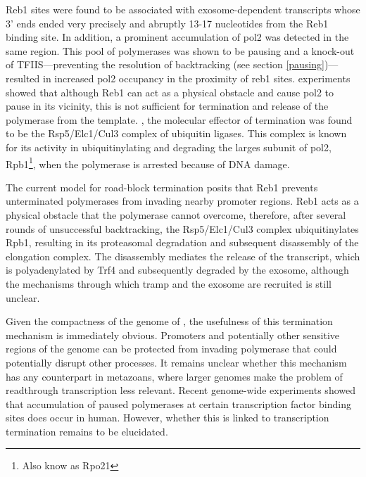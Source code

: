 Reb1 sites were found to be associated with exosome-dependent transcripts whose 3' ends ended very precisely and abruptly 13-17 nucleotides from the Reb1 binding site. 
In addition, a prominent accumulation of \gls{pol2} was detected in the same region.
This pool of polymerases was shown to be pausing and a knock-out of TFIIS---preventing the resolution of backtracking (see section \ref{pausing})---resulted in increased \gls{pol2} occupancy in the proximity of reb1 sites.
\Invitro{} experiments showed that although Reb1 can act as a physical obstacle and cause \gls{pol2} to pause in its vicinity, this is not sufficient for termination and release of the polymerase from the template.
\Invivo{}, the molecular effector of termination was found to be the Rsp5/Elc1/Cul3 complex of ubiquitin ligases.
This complex is known for its activity in ubiquitinylating and degrading the larges subunit of \gls{pol2}, Rpb1\footnote{Also know as Rpo21}, when the polymerase is arrested because of DNA damage.

The current model for road-block termination posits that Reb1 prevents unterminated polymerases from invading nearby promoter regions. 
Reb1 acts as a physical obstacle that the polymerase cannot overcome, therefore, after several rounds of unsuccessful backtracking, the Rsp5/Elc1/Cul3 complex ubiquitinylates Rpb1, resulting in its proteasomal degradation and subsequent disassembly of the elongation complex.
The disassembly mediates the release of the transcript, which is polyadenylated by Trf4 and subsequently degraded by the exosome, although the mechanisms through which \gls{tramp} and the exosome are recruited is still unclear.

Given the compactness of the genome of \cer{}, the usefulness of this termination mechanism is immediately obvious. 
Promoters and potentially other sensitive regions of the genome can be protected from invading polymerase that could potentially disrupt other processes.
It remains unclear whether this mechanism has any counterpart in metazoans, where larger genomes make the problem of readthrough transcription less relevant.
Recent genome-wide experiments showed that accumulation of paused polymerases at certain transcription factor binding sites does occur in human.
However, whether this is linked to transcription termination remains to be elucidated\cite{mayer:2015:native}.

\clearpage